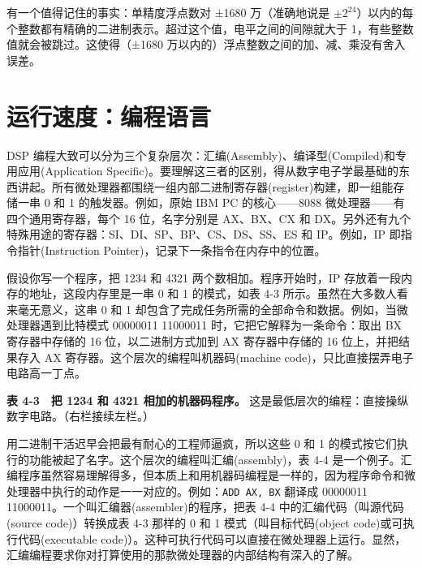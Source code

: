 有一个值得记住的事实：单精度浮点数对 ±1680 万（准确地说是
\(\pm 2^{24}\)）以内的每个整数都有精确的二进制表示。超过这个值，电平之间的间隙就大于
1，有些整数值就会被跳过。这使得（±1680
万以内的）浮点整数之间的加、减、乘没有舍入误差。

\section{运行速度：编程语言}

DSP
编程大致可以分为三个复杂层次：汇编(Assembly)、编译型(Compiled)和专用应用(Application
Specific)。要理解这三者的区别，得从数字电子学最基础的东西讲起。所有微处理器都围绕一组内部二进制寄存器(register)构建，即一组能存储一串
0 和 1 的触发器。例如，原始 IBM PC 的核心------8088
微处理器------有四个通用寄存器，每个 16 位，名字分别是 AX、BX、CX 和
DX。另外还有九个特殊用途的寄存器：SI、DI、SP、BP、CS、DS、SS、ES 和
IP。例如，IP 即指令指针(Instruction
Pointer)，记录下一条指令在内存中的位置。

假设你写一个程序，把 1234 和 4321 两个数相加。程序开始时，IP
存放着一段内存的地址，这段内存里是一串 0 和 1 的模式，如表 4-3
所示。虽然在大多数人看来毫无意义，这串 0 和 1
却包含了完成任务所需的全部命令和数据。例如，当微处理器遇到比特模式
00000011 11000011 时，它把它解释为一条命令：取出 BX 寄存器中存储的 16
位，以二进制方式加到 AX 寄存器中存储的 16 位上，并把结果存入 AX
寄存器。这个层次的编程叫机器码(machine
code)，只比直接摆弄电子电路高一丁点。

\textbf{表 4-3　把 1234 和 4321 相加的机器码程序。}
这是最低层次的编程：直接操纵数字电路。（右栏接续左栏。）

\begin{Shaded}
\begin{Highlighting}[]
\end{Highlighting}
\end{Shaded}

用二进制干活迟早会把最有耐心的工程师逼疯，所以这些 0 和 1
的模式按它们执行的功能被起了名字。这个层次的编程叫汇编(assembly)，表 4-4
是一个例子。汇编程序虽然容易理解得多，但本质上和用机器码编程是一样的，因为程序命令和微处理器中执行的动作是一一对应的。例如：\texttt{ADD\ AX,\ BX}
翻译成 00000011 11000011。一个叫汇编器(assembler)的程序，把表 4-4
中的汇编代码（叫源代码(source code)）转换成表 4-3 那样的 0 和 1
模式（叫目标代码(object code)或可执行代码(executable
code)）。这种可执行代码可以直接在微处理器上运行。显然，汇编编程要求你对打算使用的那款微处理器的内部结构有深入的了解。

